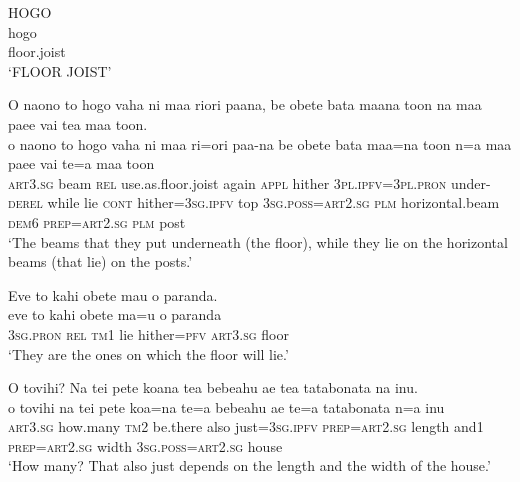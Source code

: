 \ea\label{ex:text11-39}
HOGO\\
\gll hogo\\
     floor.joist\\
\glt `FLOOR JOIST'
\z

\ea\label{ex:text11-40}
O naono to hogo vaha ni maa riori paana, be obete bata maana toon na maa paee vai tea maa toon.\\
\gll o	naono	to	hogo	vaha	ni	maa	ri=ori	paa-na	be	obete	bata	maa=na	toon	n=a	maa	paee	vai	te=a	maa	toon\\
     \textsc{art}3.\textsc{sg}	beam	\textsc{rel}	use.as.floor.joist	again	\textsc{appl}	hither	3\textsc{pl}.\textsc{ipfv}=3\textsc{pl}.\textsc{pron}	under-\textsc{derel}	while	lie	\textsc{cont}	hither=3\textsc{sg}.\textsc{ipfv}	top	3\textsc{sg}.\textsc{poss}=\textsc{art}2.\textsc{sg}	\textsc{plm}	horizontal.beam	\textsc{dem}6	\textsc{prep}=\textsc{art}2.\textsc{sg}	\textsc{plm}	post\\
\glt `The beams that they put underneath (the floor), while they lie on the horizontal beams (that lie) on the posts.'
\z

\ea\label{ex:text11-41}
Eve to kahi obete mau o paranda.\\
\gll eve	to	kahi	obete	ma=u	o	paranda\\
     3\textsc{sg}.\textsc{pron}	\textsc{rel}	\textsc{tm}1	lie	hither=\textsc{pfv}	\textsc{art}3.\textsc{sg}	floor\\
\glt `They are the ones on which the floor will lie.'
\z

\ea\label{ex:text11-42}
O tovihi? Na tei pete koana tea bebeahu ae tea tatabonata na inu.\\
\gll o	tovihi	na	tei	pete	koa=na	te=a	bebeahu	ae	te=a	tatabonata	n=a	inu\\
     \textsc{art}3.\textsc{sg}	how.many	\textsc{tm}2	be.there	also	just=3\textsc{sg}.\textsc{ipfv}	\textsc{prep}=\textsc{art}2.\textsc{sg}	length	and1	\textsc{prep}=\textsc{art}2.\textsc{sg}	width	3\textsc{sg}.\textsc{poss}=\textsc{art}2.\textsc{sg}	house\\
\glt `How many? That also just depends on the length and the width of the house.'
\z
